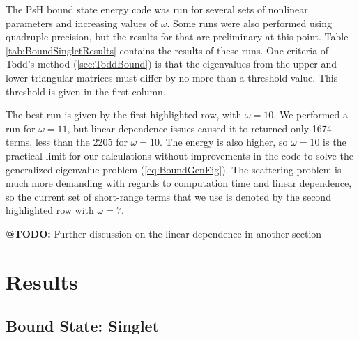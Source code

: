 \documentclass[Dissertation.tex]{subfiles}
\begin{document}
The PsH bound state energy code was run for several sets of nonlinear parameters and increasing values of $\omega$.  Some runs were also performed using quadruple precision, but the results for that are preliminary at this point.  Table \ref{tab:BoundSingletResults} contains the results of these runs.  One criteria of Todd's method (\ref{sec:ToddBound}) is that the eigenvalues from the upper and lower triangular matrices must differ by no more than a threshold value.  This threshold is given in the first column.

The best run is given by the first highlighted row, with $\omega = 10$.  We performed a run for $\omega = 11$, but linear dependence issues caused it to returned only 1674 terms, less than the 2205 for $\omega = 10$.  The energy is also higher, so $\omega = 10$ is the practical limit for our calculations without improvements in the code to solve the generalized eigenvalue problem (\ref{eq:BoundGenEig}).  The scattering problem is much more demanding with regards to computation time and linear dependence, so the current set of short-range terms that we use is denoted by the second highlighted row with $\omega = 7$.  

\textbf{@TODO:} Further discussion on the linear dependence in another section


\section{Results}
\subsection{Bound State: Singlet}
\end{document}
